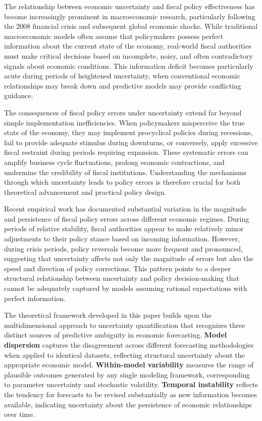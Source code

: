 \documentclass[5p,authoryear]{elsarticle}
\begin{document}
The relationship between economic uncertainty and fiscal policy effectiveness has become increasingly prominent in macroeconomic research, particularly following the 2008 financial crisis and subsequent global economic shocks. While traditional macroeconomic models often assume that policymakers possess perfect information about the current state of the economy, real-world fiscal authorities must make critical decisions based on incomplete, noisy, and often contradictory signals about economic conditions. This information deficit becomes particularly acute during periods of heightened uncertainty, when conventional economic relationships may break down and predictive models may provide conflicting guidance.

The consequences of fiscal policy errors under uncertainty extend far beyond simple implementation inefficiencies. When policymakers misperceive the true state of the economy, they may implement procyclical policies during recessions, fail to provide adequate stimulus during downturns, or conversely, apply excessive fiscal restraint during periods requiring expansion. These systematic errors can amplify business cycle fluctuations, prolong economic contractions, and undermine the credibility of fiscal institutions. Understanding the mechanisms through which uncertainty leads to policy errors is therefore crucial for both theoretical advancement and practical policy design.

Recent empirical work has documented substantial variation in the magnitude and persistence of fiscal policy errors across different economic regimes. During periods of relative stability, fiscal authorities appear to make relatively minor adjustments to their policy stance based on incoming information. However, during crisis periods, policy reversals become more frequent and pronounced, suggesting that uncertainty affects not only the magnitude of errors but also the speed and direction of policy corrections. This pattern points to a deeper structural relationship between uncertainty and policy decision-making that cannot be adequately captured by models assuming rational expectations with perfect information.

The theoretical framework developed in this paper builds upon the multidimensional approach to uncertainty quantification that recognizes three distinct sources of predictive ambiguity in economic forecasting. \textbf{Model dispersion} captures the disagreement across different forecasting methodologies when applied to identical datasets, reflecting structural uncertainty about the appropriate economic model. \textbf{Within-model variability} measures the range of plausible outcomes generated by any single modeling framework, corresponding to parameter uncertainty and stochastic volatility. \textbf{Temporal instability} reflects the tendency for forecasts to be revised substantially as new information becomes available, indicating uncertainty about the persistence of economic relationships over time.
\end{document}
